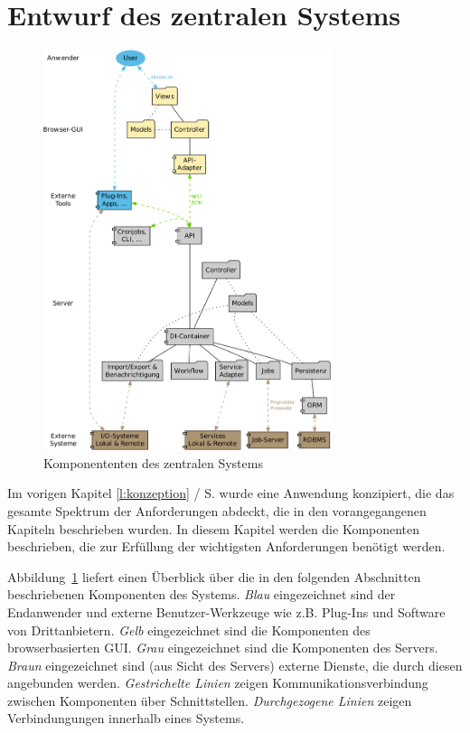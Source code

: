 \section{Entwurf des zentralen Systems}\label{l:entwurf}

\begin{figure}[htb]
\begin{center}
\includegraphics[width=0.75\textwidth]{media/komponenten.pdf}
\end{center}
\caption{Komponententen des zentralen Systems}
\label{chart:komponenten}
\end{figure}

Im vorigen Kapitel \ref{l:konzeption} / S.\pageref{l:konzeption} wurde eine Anwendung konzipiert, die das gesamte Spektrum der Anforderungen abdeckt, die in den vorangegangenen Kapiteln beschrieben wurden. In diesem Kapitel werden die Komponenten beschrieben, die zur Erfüllung der wichtigsten Anforderungen benötigt werden.

Abbildung~\ref{chart:komponenten} liefert einen Überblick über die in den folgenden Abschnitten beschriebenen Komponenten des Systems. \emph{Blau} eingezeichnet sind der Endanwender und externe Benutzer-Werkzeuge wie z.B. Plug-Ins und Software von Drittanbietern. \emph{Gelb} eingezeichnet sind die Komponenten des browserbasierten GUI. \emph{Grau} eingezeichnet sind die Komponenten des Servers. \emph{Braun} eingezeichnet sind (aus Sicht des Servers) externe Dienste, die durch diesen angebunden werden. \emph{Gestrichelte Linien} zeigen Kommunikationsverbindung zwischen Komponenten über Schnittstellen. \emph{Durchgezogene Linien} zeigen Verbindungungen innerhalb eines Systems. 

